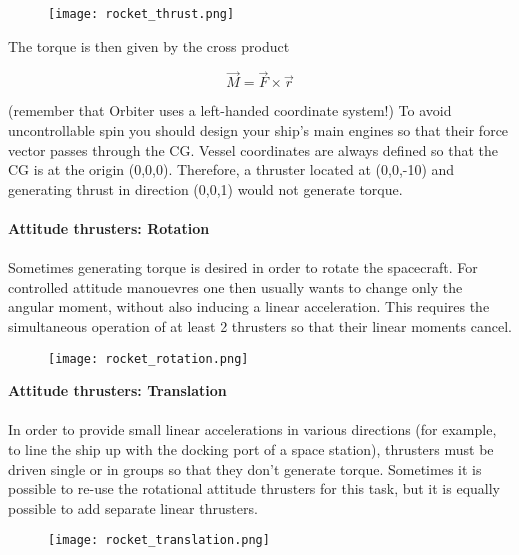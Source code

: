 \documentclass[Orbiter Developer Manual.tex]{subfiles}
\begin{document}
\begin{figure}[H]
  \centering
  \texttt{[image: rocket\_thrust.png]}
\end{figure}

\noindent
The torque is then given by the cross product

\[ \vec{M} = \vec{F} \times \vec{r} \]

\noindent
(remember that Orbiter uses a left-handed coordinate system!) To avoid uncontrollable spin you should design your ship's main engines so that their force vector passes through the CG. Vessel coordinates are always defined so that the CG is at the origin (0,0,0). Therefore, a thruster located at (0,0,-10) and generating thrust in direction (0,0,1) would not generate torque.\\
\\
\textbf{Attitude thrusters: Rotation}\\
\\
Sometimes generating torque is desired in order to rotate the spacecraft. For controlled attitude manouevres one then usually wants to change only the angular moment, without also inducing a linear acceleration. This requires the simultaneous operation of at least 2 thrusters so that their linear moments cancel.

\begin{figure}[H]
  \centering
  \texttt{[image: rocket\_rotation.png]}
\end{figure}

\noindent
\textbf{Attitude thrusters: Translation}\\
\\
In order to provide small linear accelerations in various directions (for example, to line the ship up with the docking port of a space station), thrusters must be driven single or in groups so that they don't generate torque. Sometimes it is possible to re-use the rotational attitude thrusters for this task, but it is equally possible to add separate linear thrusters.\\

\begin{figure}[H]
  \centering
  \texttt{[image: rocket\_translation.png]}
\end{figure}
\end{document}
